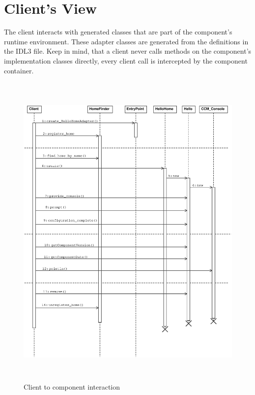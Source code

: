 \section{Client's View}

The client interacts with generated classes that are part of the component's
runtime environment. These adapter classes are generated from the definitions
in the IDL3 file.
Keep in mind, that a client never calls methods on the component's implementation
classes directly, every client call is intercepted by the component container. 

\begin{figure}[htbp]
    \begin{center}
        \includegraphics [height=16cm,angle=0] {uml/ClientView.eps}
        \caption{Client to component interaction}
        \label{ClientView}
    \end{center}
\end{figure}

